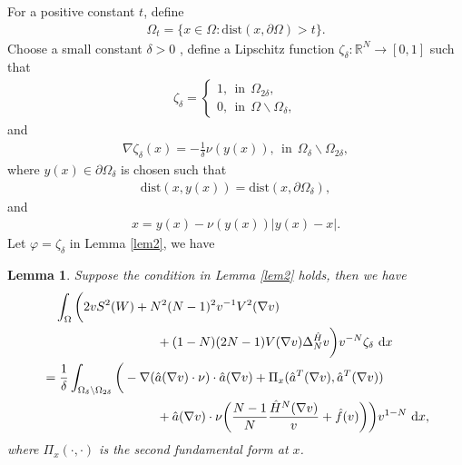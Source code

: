 \documentclass[reqno, 11pt]{amsart} %
\numberwithin{equation}{section}
\newtheorem{lemma}[thm]{Lemma}
\theoremstyle{definition}
\newcommand{\R}{\mathbb{R}}
\newcommand{\dx}{\textup{d}x}
\begin{document}
For a positive constant $t$, define
\begin{align*}
    \Omega_t = \{ x \in \Omega : \text{dist}(x,\partial \Omega) > t \}.
\end{align*}
Choose a small constant $\delta>0$ , define a Lipschitz function $\zeta_{\delta}: \R^N \to [0,1]$ such that
\begin{align*}
    \zeta_{\delta} = \begin{cases}
        1, \ \ \text{in} \ \ \Omega_{2 \delta}, \\
        0, \ \ \text{in} \ \ \Omega \backslash \Omega_{\delta},
    \end{cases}
\end{align*}
and
\begin{align*}
    \nabla \zeta_{\delta}(x) = - \frac{1}{\delta} \nu(y(x)), \ \ \text{in} \ \ \Omega_{\delta} \backslash \Omega_{2\delta},
\end{align*}
where $y(x) \in \partial \Omega_{\delta}$ is chosen such that
\begin{align*}
    \text{dist}(x, y(x)) = \text{dist}(x, \partial \Omega_{\delta}),
\end{align*}
and
\begin{align*}
     x = y(x) - \nu(y(x))|y(x)-x|.
\end{align*}
Let $\varphi = \zeta_{\delta}$ in Lemma \ref{lem2}, we have
\begin{lemma}\label{lem3}
    Suppose the condition in Lemma \ref{lem2} holds, then we have
    \begin{align}\label{3-1}
        & \quad \int_{\Omega} \bigg( 2 v S^2(W) +  N^2(N-1)^2 v^{-1} V^2(\nabla v) \nonumber \\
        & \hspace{9em} + (1-N)(2N -1) V(\nabla v) \Delta_N^{\hat{H}} v \bigg) v^{-N}\zeta_{\delta} \ \dx \nonumber\\
        & = \frac{1}{\delta} \int_{\Omega_{\delta} \backslash \Omega_{2 \delta}} \bigg( - \nabla(\hat{a}(\nabla v) \cdot \nu) \cdot \hat{a}(\nabla v) + \Pi _x(\hat{a}^T(\nabla v), \hat{a}^T(\nabla v)) \\
        & \hspace{9em} + \hat{a}(\nabla v)\cdot \nu \bigg( \frac{N-1}{N} \frac{\hat{H}^{N}(\nabla v)}{v} + \hat{f}(v)\bigg)\bigg) v^{1-N} \ \dx, \nonumber
    \end{align}
    where $\Pi_x(\cdot, \cdot)$ is the second fundamental form at $x$.
\end{lemma}
\end{document}

